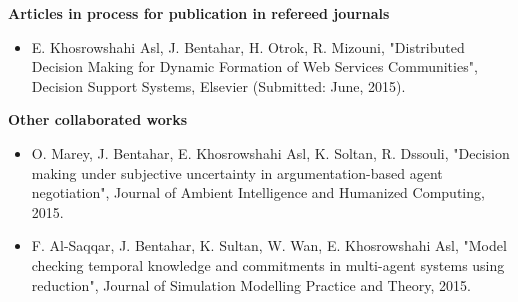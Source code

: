 \textbf{Articles in process for publication in refereed journals}

\begin{itemize}
\item E. Khosrowshahi Asl, J. Bentahar, H. Otrok, R. Mizouni, "Distributed Decision Making for Dynamic Formation of Web Services Communities", Decision Support Systems, Elsevier (Submitted: June, 2015).
\end{itemize}

\textbf{Other collaborated works}

\begin{itemize}

\item O. Marey, J. Bentahar, E. Khosrowshahi Asl, K. Soltan, R. Dssouli, "Decision making under subjective uncertainty in argumentation-based agent negotiation", Journal of Ambient Intelligence and Humanized Computing, 2015.


\item F. Al-Saqqar, J. Bentahar, K. Sultan, W. Wan, E. Khosrowshahi Asl, "Model checking temporal knowledge and commitments in multi-agent systems using reduction", Journal of Simulation Modelling Practice and Theory, 2015.
    
\end{itemize}
